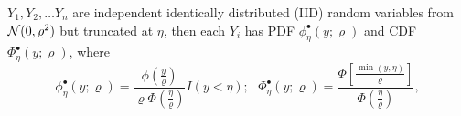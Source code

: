 \begin{comment}
Since we are assuming that the statistical parametric map $\bY$ follows a normal distribution with. To determine the normalizing constants $a_n$ and $b_n$  of the limiting distribution, we compare the approximation of limiting distribution against the true one, we follow ~\citep{polzehletal10} to choose the normalizing constants $a_n$ and $b_n$ by minimizing the mean square relative error. %

\begin{equation}
  \begin{split}
    \log([F(a_n \delta_x + b_n)]^n) = n\log ( \Phi(a_n \delta_x +b_n ) \\
    \approx \log(\exp\{ -e^{-\delta_x}\}) = -\exp\{-\delta_x\}
  \end{split}
\end{equation}
The mean relative error when assuming gaussian distribution;
\begin{equation}
  \begin{split}
   Q(a_n,b_n)= \left(\frac{n \log( \Phi(a_n \delta_x + b_n)) - (-\exp\{ -\delta_x \})}{-\exp\{-\delta_x\}}\right)^2 \\
   = \left( n \log(\Phi(a_n \delta_x +b_n))\exp\{\delta_x \}+1 \right)^2 
  \end{split}
\end{equation}
The limiting distribution is satisfy for normalizing constant such that;$G^n_{i,\alpha}(a_nx+b_n) \rightarrow G_{i,\alpha}$. If $a_n = n^{1/\alpha}$ and $b_n=0$ the limiting distribution is Fr\'echet, if $a_n^{-1/\alpha}$ and $b_n=0$ the limiting distribution is Weibull and if $a_n=1,b_n =\log n$, the limiting distribution is Gumbel. Suppose $\bX_1,\ldots, \bX_n$  are iid random vectors in $\R^m$, for $m\geq2$, with common distribution $F$. Suppose the marginal distributions of $F$ are the same and equal to some $F_1(x)$ which belong to some univariate extreme value distribution $G_{i,\alpha}(x)$, there exists constants $a_n \in \R^+, b_n \in \R$, such that $F^n_1(a_n x + b) \rightarrow G_{i,\alpha}$. For a multivariate case, using \citep{resnick2013}; let $\bX^{(n)}$ be the maximum of a random vector. If $F$ is multivariate; 
\end{comment}
$Y_1,Y_2,\ldots Y_n$ are independent identically distributed (IID) random
variables from $\mathcal N(0,\varrho^2)$ but truncated at $\eta$, then
each $Y_i$ has PDF $\phi_\eta^{\bullet}(y;\varrho)$ and
CDF $\Phi_\eta^{\bullet}(y;\varrho)$, where
\begin{equation}
  \label{truncnormal}
  \phi_\eta^{\bullet}(y;\varrho) = \frac{\phi(\frac y\varrho)}{\varrho\Phi(\frac\eta\varrho)} I(y < \eta);\:\:\: \Phi_\eta^{\bullet}(y;\varrho) = \frac{\Phi[\frac{\min(y,\eta)}\varrho]}{\Phi(\frac\eta\varrho)},
\end{equation}
